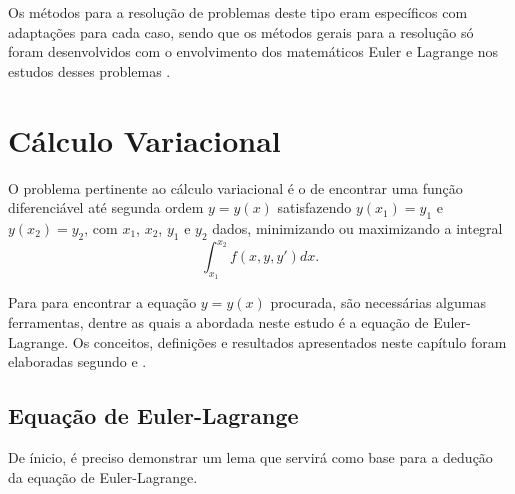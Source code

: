 \documentclass[
	12pt,				%
	openright,			%
    twoside,			%
	a4paper,			%
	english,			%
	french,				%
	spanish,			%
	brazil				%
	]{abntex2}
\numberwithin{lema}{chapter}
\numberwithin{teorema}{chapter}
\numberwithin{definicao}{chapter}
\numberwithin{figure}{chapter}
\begin{document}
Os métodos para a resolução de problemas deste tipo eram específicos com adaptações para cada caso, sendo que os métodos gerais para a resolução só foram desenvolvidos com o envolvimento dos matemáticos Euler e Lagrange nos estudos desses problemas \cite{hist_courant}.



\chapter{Cálculo Variacional}


O problema pertinente ao cálculo variacional é o de encontrar uma função diferenciável até segunda ordem $y=y(x)$ satisfazendo $y(x_1)=y_1$ e $y(x_2)=y_2$, com $x_1$, $x_2$, $y_1$ e $y_2$ dados, minimizando ou maximizando a integral
\begin{equation}
	\int_{x_1}^{x_2} f(x,y,y')dx\text{.}
	\label{eqn:int_funcional}
\end{equation}

Para para encontrar a equação $y=y(x)$ procurada, são necessárias algumas ferramentas, dentre as quais a abordada neste estudo é a equação de Euler-Lagrange. Os conceitos, definições e resultados apresentados neste capítulo foram elaboradas segundo  e .

\section{Equação de Euler-Lagrange}

De ínicio, é preciso demonstrar um lema que servirá como base para a dedução da equação de Euler-Lagrange.
\end{document}
